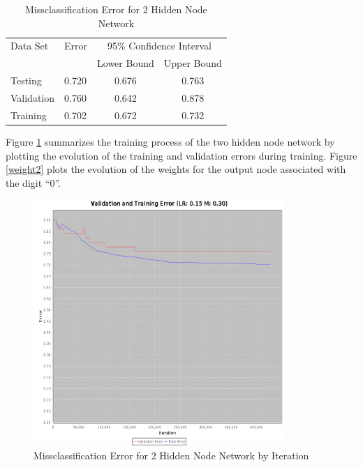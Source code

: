 \documentclass{article}
\begin{document}
\begin{table}
\caption{Missclassification Error for 2 Hidden Node Network}
\begin{center}
\begin{tabular}{llcc}
\toprule
Data Set & Error & \multicolumn{2}{c}{95\% Confidence Interval} \\
\cmidrule(r){3-4}
& & Lower Bound & Upper Bound \\
\midrule
Testing       & 0.720 &  0.676 & 0.763  \\
Validation    & 0.760 &  0.642 & 0.878  \\
Training      & 0.702 &  0.672 & 0.732  \\
\bottomrule
\end{tabular}
\label{table2}
\end{center}
\end{table}

Figure \ref{error2} summarizes the training process of the two hidden node network by plotting the evolution of the training and validation errors during training. Figure \ref{weight2} plots the evolution of the weights for the output node associated with the digit ``0''.

\begin{figure}
\centering
\includegraphics[width=0.85\textwidth]{data/final/2_hidden_node_error.png}
\caption{Missclassification Error for 2 Hidden Node Network by Iteration}
\label{error2}
\end{figure}
\end{document}
